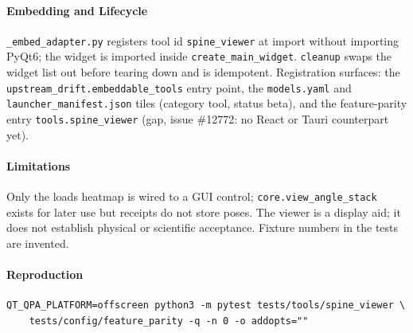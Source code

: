 \paragraph{Embedding and Lifecycle}
\texttt{\_embed\_adapter.py} registers tool id \texttt{spine\_viewer} at import
without importing PyQt6; the widget is imported inside
\texttt{create\_main\_widget}. \texttt{cleanup} swaps the widget list out before
tearing down and is idempotent. Registration surfaces: the
\texttt{upstream\_drift.embeddable\_tools} entry point, the \texttt{models.yaml}
and \texttt{launcher\_manifest.json} tiles (category tool, status beta), and the
feature-parity entry \texttt{tools.spine\_viewer} (gap, issue \#12772: no
React or Tauri counterpart yet).

\paragraph{Limitations}
Only the loads heatmap is wired to a GUI control; \texttt{core.view\_angle\_stack}
exists for later use but receipts do not store poses. The viewer is a display
aid; it does not establish physical or scientific acceptance. Fixture numbers in
the tests are invented.

\paragraph{Reproduction}
\begin{verbatim}
QT_QPA_PLATFORM=offscreen python3 -m pytest tests/tools/spine_viewer \
    tests/config/feature_parity -q -n 0 -o addopts=""
\end{verbatim}
